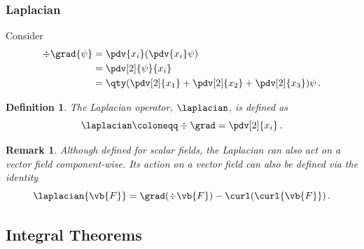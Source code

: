 \documentclass{article}
\theoremstyle{plain}\theoremheaderfont{\normalfont\itshape}\theorembodyfont{\rmfamily}\theoremseparator{.}\newtheorem*{rem}{Remark}\newtheorem*{ex}{Example}\newtheorem*{proof}{Proof}\newtheorem*{altp}{Alternative proof}
\theoremstyle{plain}\theoremheaderfont{\normalfont\bfseries}\theorembodyfont{\rmfamily}\theoremseparator{.}\newtheorem{thm}{Theorem}[section]\newtheorem{lem}[thm]{Lemma}\newtheorem{prop}[thm]{Proposition}\newtheorem*{cor}{Corollary}\newtheorem{defn}[thm]{Definition}\newtheorem{clm}[thm]{Claim}\newtheorem{clminproof}{Claim}
\theoremstyle{break}\theoremheaderfont{\normalfont\itshape}\theorembodyfont{\rmfamily}\theoremseparator{.\medskip}\newtheorem*{proofskip}{Proof}\newtheorem*{exs}{Examples}\newtheorem*{rems}{Remarks}
\theoremstyle{break}\theoremheaderfont{\normalfont\bfseries}\theorembodyfont{\rmfamily}\theoremseparator{.\medskip}\newtheorem{lemskip}[thm]{Lemma}\newtheorem{defnskip}[thm]{Definition}\newtheorem{propskip}[thm]{Proposition}\newtheorem{thmskip}[thm]{Theorem}
\numberwithin{equation}{section}
\begin{document}
	\subsubsection{Laplacian}
	Consider
	\begin{align*}
		\div{\grad{\psi}}&=\pdv{x_i}(\pdv{x_i}\psi)\\
		&=\pdv[2]{\psi}{x_i}\\
		&=\qty(\pdv[2]{x_1}+\pdv[2]{x_2}+\pdv[2]{x_3})\psi\,.	
	\end{align*}
	
	\begin{defn}
		The \textit{Laplacian operator}, \(\laplacian\), is defined as
		\[\laplacian\coloneqq\div\grad=\pdv[2]{x_i}\,.\]
	\end{defn}
	
	\begin{rem}
		Although defined for scalar fields, the Laplacian can also act on a vector field component-wise. Its action on a vector field can also be defined via the identity
		\[\laplacian{\vb{F}}=\grad(\div\vb{F})-\curl(\curl{\vb{F}})\,.\]
	\end{rem}
	
	\subsection{Integral Theorems}
\end{document}
